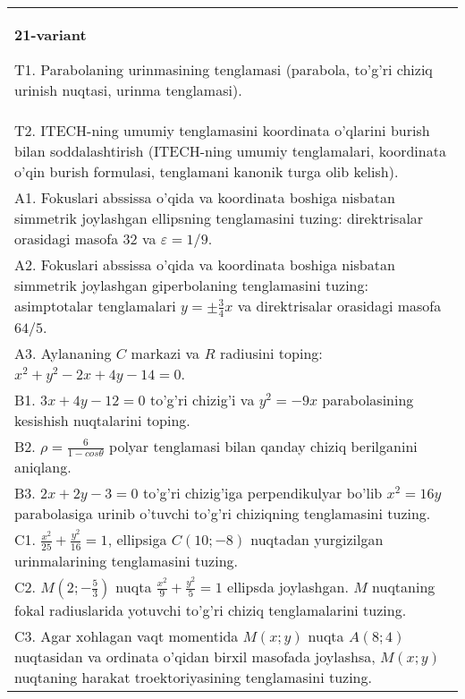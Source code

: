 \documentclass{article}
\begin{document}
\begin{tabular}{m{17cm}}
\textbf{21-variant}
\newline

T1. Parabolaning urinmasining tenglamasi (parabola, to'g'ri chiziq urinish nuqtasi, urinma tenglamasi).\\

T2. ITECH-ning umumiy tenglamasini koordinata o'qlarini burish bilan soddalashtirish (ITECH-ning umumiy tenglamalari, koordinata o'qin burish formulasi, tenglamani kanonik turga olib kelish).\\

A1. Fokuslari abssissa o'qida va koordinata boshiga nisbatan simmetrik joylashgan ellipsning tenglamasini tuzing: direktrisalar orasidagi masofa $32$ va $\varepsilon=1/9$.\\

A2. Fokuslari abssissa o'qida va koordinata boshiga nisbatan simmetrik joylashgan giperbolaning tenglamasini tuzing: asimptotalar tenglamalari $y=\pm \frac{3}{4}x$ va direktrisalar orasidagi masofa $64/5$.\\

A3. Aylananing $C$ markazi va $R$ radiusini toping: $x^2+y^2-2x+4y-14=0$.\\

B1. $3x + 4y - 12 = 0$ to'g'ri chizig'i va $y^{2} = - 9x$ parabolasining kesishish nuqtalarini toping.\\

B2. $\rho = \frac{6}{1 - cos\theta}$ polyar tenglamasi bilan qanday chiziq berilganini aniqlang.  \\

B3. $2x + 2y - 3 = 0$ to'g'ri chizig'iga perpendikulyar bo'lib $x^{2} = 16y$ parabolasiga urinib o'tuvchi to'g'ri chiziqning tenglamasini tuzing.  \\

C1. $\frac{x^{2}}{25} + \frac{y^{2}}{16} = 1$, ellipsiga $C(10; - 8)$ nuqtadan yurgizilgan urinmalarining tenglamasini tuzing.  \\

C2. $M(2; - \frac{5}{3})$ nuqta $\frac{x^{2}}{9} + \frac{y^{2}}{5} = 1$ ellipsda joylashgan. $M$ nuqtaning fokal radiuslarida yotuvchi to'g'ri chiziq tenglamalarini tuzing.  \\

C3. Agar xohlagan vaqt momentida $M(x;y)$ nuqta $A(8;4)$ nuqtasidan va ordinata o'qidan birxil masofada joylashsa, $M(x;y)$ nuqtaning harakat troektoriyasining tenglamasini tuzing.  \\

\end{tabular}
\vspace{1cm}
\end{document}
